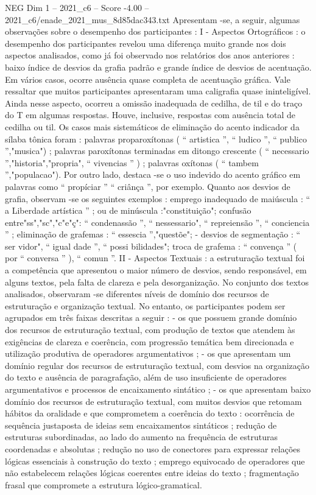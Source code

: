 \begin{textsample}{NEG Dim 1 – 2021\_c6 – Score -4.00 – 2021\_c6/enade\_2021\_mus\_8d85dac343.txt}
Apresentam -se, a seguir, algumas observações sobre o desempenho dos participantes : I - Aspectos Ortográficos : o desempenho dos participantes revelou uma diferença muito grande nos dois aspectos analisados, como já foi observado nos relatórios dos anos anteriores : baixo índice de desvios da grafia padrão e grande índice de desvios de acentuação.
Em vários casos, ocorre ausência quase completa de acentuação gráfica.
Vale ressaltar que muitos participantes apresentaram uma caligrafia quase ininteligível.
Ainda nesse aspecto, ocorreu a omissão inadequada de cedilha, de til e do traço do T em algumas respostas.
Houve, inclusive, respostas com ausência total de cedilha ou til.
Os casos mais sistemáticos de eliminação do acento indicador da sílaba tônica foram : palavras proparoxítonas ( “ artistica ”, “ ludico ”, “ publico ”,"musica") ; palavras paroxítonas terminadas em ditongo crescente ( “ necessario ”,"historia","propria", “ vivencias ” ) ; palavras oxítonas ( “ tambem ”,"populacao").
Por outro lado, destaca -se o uso indevido do acento gráfico em palavras como “ propíciar ” “ criânça ”, por exemplo.
Quanto aos desvios de grafia, observam -se os seguintes exemplos : emprego inadequado de maiúscula : “ a Liberdade artística ” ; ou de minúscula :"constituição"; confusão entre"ss","sc","c"e"ç": “ condenassão ”, “ nessessario", “ repreiensão ”, “ conciencia ” ; eliminação de grafemas : “ essescia ”,"questõe"; - desvios de segmentação : “ ser vidor", “ igual dade ”, “ possi bilidades"; troca de grafema : “ convença ” ( por “ conversa ” ), “ comun ”.
II - Aspectos Textuais : a estruturação textual foi a competência que apresentou o maior número de desvios, sendo responsável, em alguns textos, pela falta de clareza e pela desorganização.
No conjunto dos textos analisados, observaram -se diferentes níveis de domínio dos recursos de estruturação e organização textual.
No entanto, os participantes podem ser agrupados em três faixas descritas a seguir : - os que possuem grande domínio dos recursos de estruturação textual, com produção de textos que atendem às exigências de clareza e coerência, com progressão temática bem direcionada e utilização produtiva de operadores argumentativos ; - os que apresentam um domínio regular dos recursos de estruturação textual, com desvios na organização do texto e ausência de paragrafação, além de uso insuficiente de operadores argumentativos e processos de encaixamento sintático ; - os que apresentam baixo domínio dos recursos de estruturação textual, com muitos desvios que retomam hábitos da oralidade e que comprometem a coerência do texto : ocorrência de sequência justaposta de ideias sem encaixamentos sintáticos ; redução de estruturas subordinadas, ao lado do aumento na frequência de estruturas coordenadas e absolutas ; redução no uso de conectores para expressar relações lógicas essenciais à construção do texto ; emprego equivocado de operadores que não estabelecem relações lógicas coerentes entre ideias do texto ; fragmentação frasal que compromete a estrutura lógico-gramatical.

\end{textsample}

